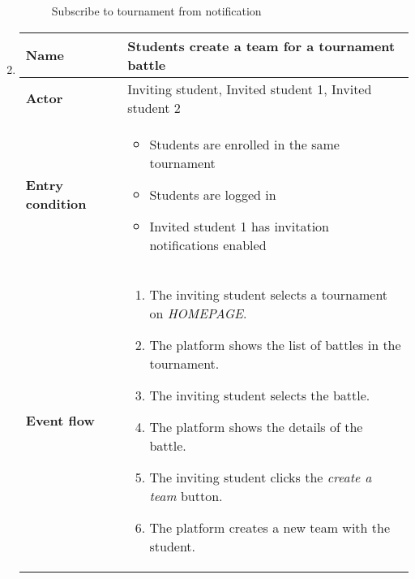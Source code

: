 \begin{enumerate}[label=\textbf{UC\arabic*}:,leftmargin=1.3cm]
            \begin{figure}[H]
                  \centering
                  \caption{Subscribe to tournament from notification}
                  \label{fig:Subscribe to tournament from notification}
            \end{figure}
            \pagebreak
      \item \textbf{}
            \begin{table}[H]
                  \centering
                  \begin{tabular}{|l|p{11.9cm}|}
                        \hline
                        \textbf{Name}            & Students create a team for a tournament battle                              \\\hline
                        \textbf{Actor}           & Inviting student, Invited student 1, Invited student 2                      \\\hline
                        \textbf{Entry condition} &
                        \begin{itemize}
                              \item Students are enrolled in the same tournament
                              \item Students are logged in
                              \item Invited student 1 has invitation notifications enabled
                        \end{itemize}                                            \\\hline
                        \textbf{Event flow}      &
                        \begin{enumerate}[label=\arabic*.]
                              \item The inviting student selects a tournament on \emph{HOMEPAGE}.
                              \item The platform shows the list of battles in the tournament.
                              \item The inviting student selects the battle.
                              \item The platform shows the details of the battle.
                              \item The inviting student clicks the \emph{create a team} button.
                              \item The platform creates a new team with the student.

\end{enumerate}
\end{tabular}
\end{table}
\end{enumerate}
